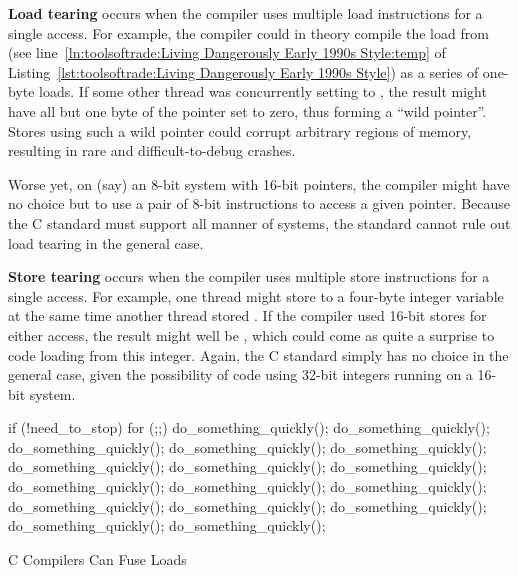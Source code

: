 {\bf Load tearing} occurs when the compiler uses multiple load
instructions for a single access.
For example, the compiler could in theory compile the load from
 (see
line~\ref{ln:toolsoftrade:Living Dangerously Early 1990s Style:temp} of
Listing~\ref{lst:toolsoftrade:Living Dangerously Early 1990s Style})
as a series of one-byte loads.
If some other thread was concurrently setting  to
, the result might have all but one byte of the pointer
set to zero, thus forming a ``wild pointer''.
Stores using such a wild pointer could corrupt arbitrary
regions of memory, resulting in rare and difficult-to-debug crashes.

Worse yet, on (say) an 8-bit system with 16-bit pointers, the compiler
might have no choice but to use a pair of 8-bit instructions to access
a given pointer.
Because the C standard must support all manner of systems, the standard
cannot rule out load tearing in the general case.

{\bf Store tearing} occurs when the compiler uses multiple store
instructions for a single access.
For example, one thread might store  to a four-byte integer
variable at the same time another thread stored .
If the compiler used 16-bit stores for either access, the result
might well be , which could come as quite a surprise to
code loading from this integer.
Again, the C standard simply has no choice in the general case, given
the possibility of code using 32-bit integers running on a 16-bit system.

\begin{listing}[tbp]
\begin{linelabel}
\begin{VerbatimL}[commandchars=\\\[\]]
if (!need_to_stop)
	for (;;) {\lnlbl[loop:b]
		do_something_quickly();
		do_something_quickly();
		do_something_quickly();
		do_something_quickly();
		do_something_quickly();
		do_something_quickly();
		do_something_quickly();
		do_something_quickly();
		do_something_quickly();
		do_something_quickly();
		do_something_quickly();
		do_something_quickly();
		do_something_quickly();
		do_something_quickly();
		do_something_quickly();
		do_something_quickly();
	}\lnlbl[loop:e]
\end{VerbatimL}
\end{linelabel}
\caption{C Compilers Can Fuse Loads}
\label{lst:toolsoftrade:C Compilers Can Fuse Loads}
\end{listing}

